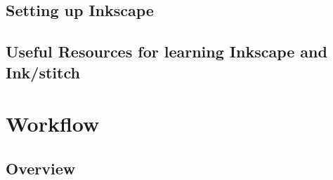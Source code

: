 \documentclass{article}
\begin{document}
        \subsection{Setting up Inkscape}

        \subsection{Useful Resources for learning Inkscape and Ink/stitch}

    \pagebreak

    \section{Workflow}
        \subsection{Overview}
\end{document}
